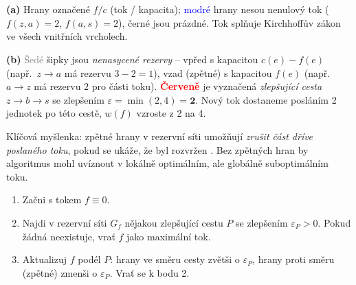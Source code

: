 \documentclass[11pt,a4paper]{article}
\begin{document}
\begin{center}
\\[0.2em]
\hfill
{}\\[0.3em]
\begin{minipage}{0.96\linewidth}\small
\textbf{(a)} Hrany označené {\footnotesize $f/c$} (tok / kapacita); \textcolor{blue}{modré} hrany nesou nenulový tok ($f(z,a)=2$, $f(a,s)=2$), černé jsou prázdné. Tok splňuje Kirchhoffův zákon ve všech vnitřních vrcholech.

\smallskip
\textbf{(b)} \textcolor{gray}{Šedé} šipky jsou \emph{nenasycené rezervy} -- vpřed s kapacitou $c(e)-f(e)$ (např.\ $z\to a$ má rezervu $3-2=1$), vzad (zpětné) s kapacitou $f(e)$ (např.\ $a\to z$ má rezervu $2$ pro  části toku). \textcolor{red}{\textbf{Červeně}} je vyznačená \emph{zlepšující cesta} $z\to b\to s$ se zlepšením $\varepsilon=\min(2,4)=\mathbf{2}$. Nový tok dostaneme posláním 2 jednotek po této cestě, $w(f)$ vzroste z 2 na 4.
\end{minipage}
\end{center}

\begin{intuice}
Klíčová myšlenka: zpětné hrany v rezervní síti umožňují \emph{zrušit část dříve poslaného toku}, pokud se ukáže, že byl rozvržen . Bez zpětných hran by algoritmus mohl uvíznout v lokálně optimálním, ale globálně suboptimálním toku.
\end{intuice}

\begin{veta}\leavevmode
\begin{enumerate}[label=(\arabic*)]
  \item Začni s tokem $f\equiv 0$.
  \item Najdi v rezervní síti $G_f$ nějakou zlepšující cestu $P$ se zlepšením $\varepsilon_P>0$. Pokud žádná neexistuje, vrať $f$ jako maximální tok.
  \item Aktualizuj $f$ podél $P$: hrany ve směru cesty zvětši o $\varepsilon_P$, hrany proti směru (zpětné) zmenši o $\varepsilon_P$. Vrať se k bodu 2.
\end{enumerate}
\end{veta}
\end{document}
